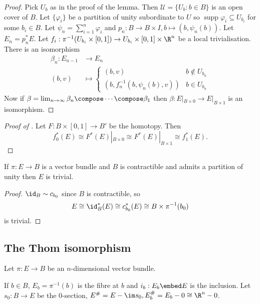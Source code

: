 \documentclass[a4paper]{article}
\DeclareMathOperator{\supp}{supp} %
\begin{document}
\begin{proof}
  Pick \(U_b\) as in the proof of the lemma. Then \(\mathcal U = \{U_b: b \in B\}\) is an open cover of \(B\). Let \(\{\varphi_i\}\) be a partition of unity subordinate to \(U\) so \(\supp \varphi_i \subseteq U_{b_i}\) for some \(b_i \in B\). Let \(\psi_n = \sum_{i = 1}^n \varphi_i\) and \(p_n: B \to B \times I, b \mapsto (b, \psi_n(b))\). Let \(E_n = p_n^*E\). Let \(f_i: \pi^{-1}(U_{b_i} \times [0, 1]) \to U_{b_i} \times [0, 1] \times \R^n\) be a local trivialisation. There is an isomorphism
  \begin{align*}
    \beta_n: E_{n - 1} &\to E_n \\
    (b, v) &\mapsto
             \begin{cases}
               (b, v) & b \notin U_{b_n} \\
               (b, f_n^{-1}(b, \psi_n(b), v)) & b \in U_{b_n}
             \end{cases}
  \end{align*}
  Now if \(\beta = \lim_{n \to \infty} \beta_n \compose \cdots \compose \beta_1\) then \(\beta: E|_{B \times 0} \to E|_{B \times 1}\) is an isomorphism.
\end{proof}

\begin{proof}[Proof of ]
  Let \(F: B \times [0, 1] \to B'\) be the homotopy. Then
  \[
    f_0^*(E) \cong F^*(E)|_{B \times 0} \cong F^*(E)|_{B \times 1} \cong f_1^*(E).
  \]
\end{proof}

\begin{corollary}
  If \(\pi: E \to B\) is a vector bundle and \(B\) is contractible and admits a partition of unity then \(E\) is trivial.
\end{corollary}

\begin{proof}
  \(\id_B \sim c_{b_0}\) since \(B\) is contractible, so
  \[
    E \cong \id_B^*(E) \cong c_{b_0}^*(E) \cong B \times \pi^{-1}(b_0)
  \]
  is trivial.
\end{proof}

\subsection{The Thom isomorphism}

Let \(\pi: E \to B\) be an \(n\)-dimensional vector bundle.

\begin{notation}
  If \(b \in B\), \(E_b = \pi^{-1}(b)\) is the fibre at \(b\) and \(i_b: E_b \embed E\) is the inclusion. Let \(s_0: B \to E\) be the \(0\)-section, \(E^\# = E - \im s_0, E_b^\# = E_b - 0 \cong \R^n - 0\).
\end{notation}
\end{document}
